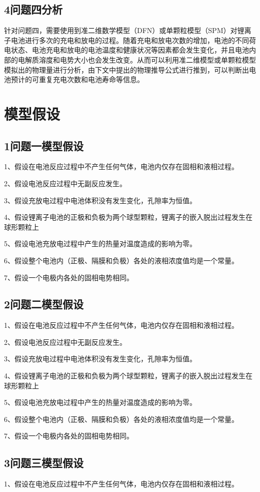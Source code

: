 \documentclass[12pt]{ctexart}%
\begin{document}
\subsection{4问题四分析}
针对问题四，需要使用到准二维数学模型（DFN）或单颗粒模型（SPM）对锂离子电池进行多次的充电和放电的过程。随着充电和放电次数的增加，电池的不同荷电状态、电池充电和放电的电池温度和健康状况等因素都会发生变化，并且电池内部的电解质溶度和电势大小也会发生改变。从而可以利用准二维模型或单颗粒模型模拟出的物理量进行分析，由下文中提出的物理推导公式进行推到，可以判断出电池预计的可重复充电次数和电池寿命等信息。
\section{模型假设}
\subsection{1问题一模型假设}
1、假设在电池反应过程中不产生任何气体，电池内仅存在固相和液相过程。

2、假设电池反应过程中无副反应发生。

3、假设充放电过程中电池体积没有发生变化，孔隙率为恒值。

4、假设锂离子电池的正极和负极为两个球型颗粒，锂离子的嵌入脱出过程发生在球形颗粒上

5、假设电池充放电过程中产生的热量对温度造成的影响为零。

6、假设整个电池内（正极、隔膜和负极）各处的液相浓度值均是一个常量。

7、假设一个电极内各处的固相电势相同。
\subsection{2问题二模型假设}
1、假设在电池反应过程中不产生任何气体，电池内仅存在固相和液相过程。

2、假设电池反应过程中无副反应发生。

3、假设充放电过程中电池体积没有发生变化，孔隙率为恒值。

4、假设锂离子电池的正极和负极为两个球型颗粒，锂离子的嵌入脱出过程发生在球形颗粒上

5、假设电池充放电过程中产生的热量对温度造成的影响为零。

6、假设整个电池内（正极、隔膜和负极）各处的液相浓度值均是一个常量。

7、假设一个电极内各处的固相电势相同。
\subsection{3问题三模型假设}
1、假设在电池反应过程中不产生任何气体，电池内仅存在固相和液相过程。
\end{document}
